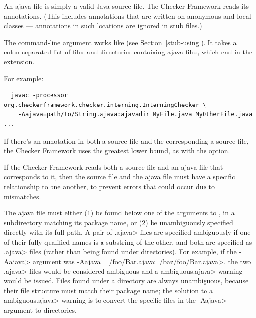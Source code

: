 An ajava file is simply a valid Java source file.
The Checker Framework reads its annotations.
(This includes annotations that are written
on anonymous and local classes --- annotations in such locations are ignored
in stub files.)



The  command-line argument works like  (see
Section~\ref{stub-using}). It takes a colon-separated list of
files and directories containing ajava files, which end in the 
extension.

For example:

\begin{myxsmall}
\begin{Verbatim}
  javac -processor org.checkerframework.checker.interning.InterningChecker \
    -Aajava=path/to/String.ajava:ajavadir MyFile.java MyOtherFile.java ...
\end{Verbatim}
\end{myxsmall}

If there's an annotation in both a source file and the corresponding a
source file, the Checker Framework uses the greatest lower bound, as with
the \code{-AmergeStubsWithSource} option.




If the Checker Framework reads both a source file and an ajava file that
corresponds to it, then the source file and the ajava file must have a
specific relationship to one another, to prevent errors that could occur
due to mismatches.



The ajava file must either (1) be found below one of the arguments to
\code{-Aajava}, in a subdirectory matching its package name, or (2) be
unambiguously specified directly with its full path. A pair of \<.ajava>
files are specified ambiguously if one of their fully-qualified names
is a substring of the other, and both are specified as \<.ajava> files (rather
than being found under directories). For example, if the \<-Aajava> argument
was \<-Aajava=~/foo/Bar.ajava:~/baz/foo/Bar.ajava>, the two \<.ajava> files
would be considered ambiguous and a \<ambiguous.ajava> warning would be issued.
Files found under a directory are always unambiguous, because their file structure
must match their package name; the solution to a \<ambiguous.ajava> warning is to
convert the specific files in the \<-Aajava> argument to directories.


